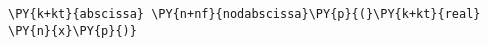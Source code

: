 \begin{Verbatim}[commandchars=\\\{\}]
    \PY{k+kt}{abscissa} \PY{n+nf}{nodabscissa}\PY{p}{(}\PY{k+kt}{real} \PY{n}{x}\PY{p}{)}
\end{Verbatim}
